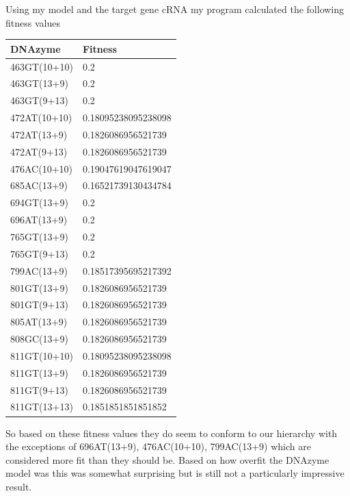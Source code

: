 \documentclass[11pt]{article}
\begin{document}
Using my model and the target gene cRNA my program calculated the following fitness values
\begin{center}
    \begin{tabular}{l|l}
    DNAzyme & Fitness \\
    \hline
    463GT(10+10) & 0.2\\
    463GT(13+9) & 0.2\\
    463GT(9+13) & 0.2\\
    472AT(10+10) & 0.18095238095238098\\
    472AT(13+9) & 0.1826086956521739\\
    472AT(9+13) & 0.1826086956521739\\
    476AC(10+10) & 0.19047619047619047\\
    685AC(13+9) & 0.16521739130434784\\
    694GT(13+9) & 0.2\\
    696AT(13+9) & 0.2\\
    765GT(13+9) & 0.2\\
    765GT(9+13) & 0.2\\
    799AC(13+9) & 0.18517395695217392\\
    801GT(13+9) & 0.1826086956521739\\
    801GT(9+13) & 0.1826086956521739\\
    805AT(13+9) & 0.1826086956521739\\
    808GC(13+9) & 0.1826086956521739\\
    811GT(10+10) & 0.18095238095238098\\
    811GT(13+9) & 0.1826086956521739\\
    811GT(9+13) & 0.1826086956521739\\
    811GT(13+13) & 0.1851851851851852\\
    \end{tabular}
\end{center}

So based on these fitness values they do seem to conform to our hierarchy with the exceptions of 696AT(13+9), 476AC(10+10), 799AC(13+9) which are considered more fit than they should be.
Based on how overfit the DNAzyme model was this was somewhat surprising but is still not a particularly impressive result.
\end{document}
